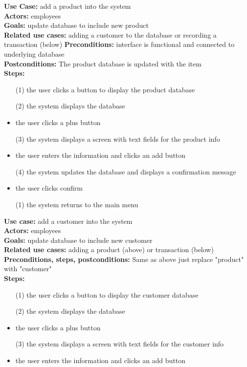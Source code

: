 \documentclass[notitlepage, 11pt]{report}
\begin{document}
\begin{enumerate}[itemindent=-1.5em]
	\textbf{Use Case:} add a product into the system\\
	\textbf{Actors:} employees\\
	\textbf{Goals:} update database to include new product\\
	\textbf{Related use cases:} adding a customer to the database or recording a transaction (below)
	\textbf{Preconditions:} interface is functional and connected to underlying database\\
	\textbf{Postconditions:} The product database is updated with the item\\
	\textbf{Steps:}
		\begin{itemize}
		\item[(1)] the user clicks a button to display the product database
		\item[(2)] the system displays the database
		\item the user clicks a plus button 
		\item[(3)] the system displays a screen with text fields for the product info
		\item the user enters the information and clicks an add button
		\item[(4)] the system updates the database and displays a confirmation message
		\item the user clicks confirm 
		\item[(1)] the system returns to the main menu
		\end{itemize}
	\textbf{Use case:} add a customer into the system\\
	\textbf{Actors:} employees\\
	\textbf{Goals:} update database to include new customer\\
	\textbf{Related use cases:} adding a product (above) or transaction (below)\\
	\textbf{Preconditions, steps, postconditions:} Same as above just replace "product" with "customer"\\
		\textbf{Steps:}
		\begin{itemize}
		\item[(1)] the user clicks a button to display the customer database
		\item[(2)] the system displays the database
		\item the user clicks a plus button 
		\item[(3)] the system displays a screen with text fields for the customer info
		\item the user enters the information and clicks an add button

\end{itemize}
\end{enumerate}
\end{document}
